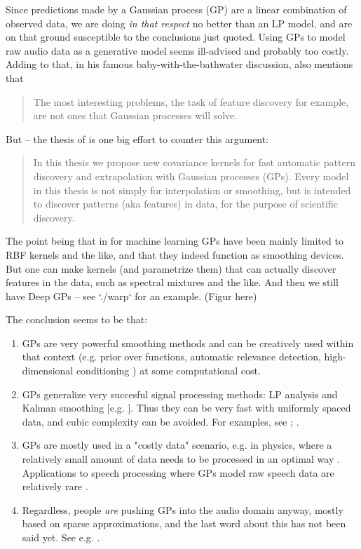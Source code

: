 \begin{chapterappendices}{5}
\begin{quote}
\end{quote}
Since predictions made by a Gaussian process (GP) are a linear combination of observed data, we are doing \emph{in that respect} no better than an LP model, and are on that ground susceptible to the conclusions just quoted.
Using GPs to model raw audio data as a generative model seems ill-advised and probably too costly.
Adding to that, \citep[p.~548]{MacKay2005} in his famous baby-with-the-bathwater discussion, also mentions that
\begin{quote}
	The most interesting problems, the task of feature discovery for example, are not ones that Gaussian processes will solve.
\end{quote}
But -- the thesis of \citet{Wilson2014} is one big effort to counter this argument:
\begin{quote}
	In this thesis we propose new covariance kernels for fast automatic pattern discovery and extrapolation with Gaussian processes (GPs).
	Every model in this thesis is not simply for interpolation or smoothing, but is intended to discover patterns (aka features) in data, for the purpose of scientific discovery.
\end{quote}
The point being that in for machine learning GPs have been mainly limited to RBF kernels and the like, and that they indeed function as smoothing devices.
But one can make kernels (and parametrize them) that can actually discover features in the data, such as spectral mixtures and the like.
And then we still have Deep GPs -- see `./warp` for an example. (Figur here)

The conclusion seems to be that:
\begin{enumerate}
	\item GPs are very powerful smoothing methods and can be creatively used within that context (e.g.  prior over functions, automatic relevance detection, high-dimensional conditioning \citep{Park2008}) at some computational cost.
	
	\item GPs generalize very succesful signal processing methods: LP analysis and Kalman smoothing [e.g. \citep{Reece2010}].
	Thus they can be very fast with uniformly spaced data, and cubic complexity can be avoided.
	For examples, see \citep[p.~141]{Wilson2014}; \citep[p.~25]{Wilkinson2019}.
	
	\item GPs are mostly used in a "costly data" scenario, e.g.  in physics, where a relatively small amount of data needs to be processed in an optimal way \citep[e.g.]{Shen2019}.
	Applications to speech processing where GPs model raw speech data are relatively rare \citep{Koriyama2020}.
	
	\item Regardless, people \emph{are} pushing GPs into the audio domain anyway, mostly based on sparse approximations, and the last word about this has not been said yet.  See e.g.  \citep{Alvarado2016,Wilkinson2019,Wilson2014}.
\end{enumerate}

\end{chapterappendices}